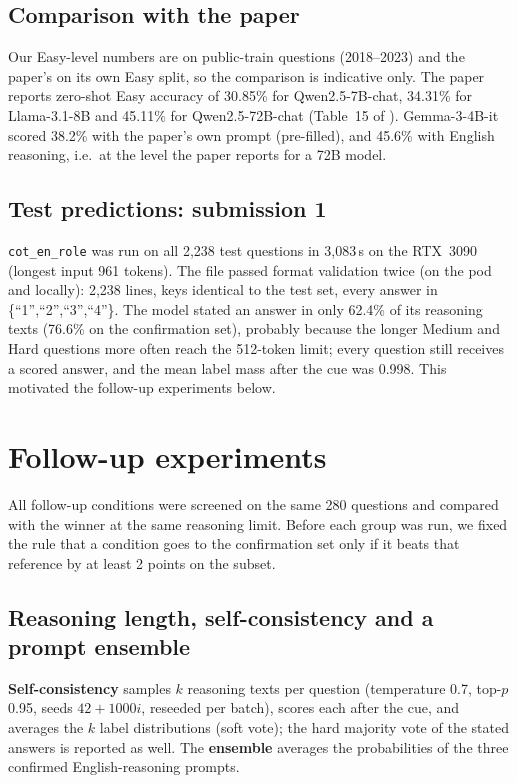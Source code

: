 \documentclass[10pt,a4paper]{article}
\newcommand{\cond}[1]{\texttt{#1}}
\begin{document}
\subsection{Comparison with the paper}
Our Easy-level numbers are on public-train questions (2018--2023) and the paper's on its own Easy split, so the
comparison is indicative only. The paper reports zero-shot Easy accuracy of 30.85\% for Qwen2.5-7B-chat, 34.31\% for
Llama-3.1-8B and 45.11\% for Qwen2.5-72B-chat (Table~15 of \cite{pramodya2025}). Gemma-3-4B-it scored 38.2\% with
the paper's own prompt (pre-filled), and 45.6\% with English reasoning, i.e.\ at the level the paper reports for a
72B model.

\subsection{Test predictions: submission 1}
\cond{cot\_en\_role} was run on all 2,238 test questions in 3,083\,s on the RTX~3090 (longest input 961 tokens).
The file passed format validation twice (on the pod and locally): 2,238 lines, keys identical to the test set, every
answer in \{``1'',``2'',``3'',``4''\}. The model stated an answer in only 62.4\% of its reasoning texts (76.6\% on the
confirmation set), probably because the longer Medium and Hard questions more often reach the 512-token limit; every
question still receives a scored answer, and the mean label mass after the cue was 0.998. This motivated the
follow-up experiments below.

\section{Follow-up experiments}\label{sec:followup}
All follow-up conditions were screened on the same 280 questions and compared with the winner at the same reasoning
limit. Before each group was run, we fixed the rule that a condition goes to the confirmation set only if it beats
that reference by at least 2 points on the subset.

\subsection{Reasoning length, self-consistency and a prompt ensemble}
\textbf{Self-consistency} \cite{wang2023} samples $k$ reasoning texts per question (temperature 0.7, top-$p$ 0.95,
seeds $42 + 1000i$, reseeded per batch), scores each after the cue, and averages the $k$ label distributions
(soft vote); the hard majority vote of the stated answers is reported as well. The \textbf{ensemble} averages the
probabilities of the three confirmed English-reasoning prompts.
\end{document}
